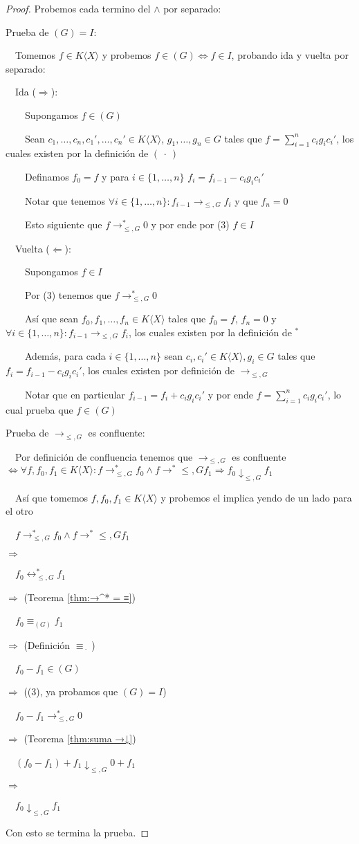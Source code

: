\documentclass{amsbook}
\theoremstyle{customstyle}
\begin{document}
\begin{proof}
Probemos cada termino del $∧$ por separado:

Prueba de $(G) = I$:

  Tomemos $f ∈ K⟨X⟩$ y probemos $f ∈ (G) ⇔ f ∈ I$, probando ida y vuelta por separado:

  Ida ($⇒$):

    Supongamos $f ∈ (G)$

    Sean $c_1, …, c_n, c_1', …, c_n' ∈ K⟨X⟩$, $g_1, …, g_n ∈ G$ tales que $f = \sum_{i = 1}^n c_i g_i c_i'$, los cuales existen por la definición de $(\ ·\ )$

    Definamos $f_0 = f$ y para $i ∈ \{1, …, n\}$ $f_i = f_{i-1} - c_i g_i c_i'$

    Notar que tenemos $∀i ∈ \{1, …, n\} : f_{i-1} →_{≤, G} f_i$ y que $f_n = 0$

    Esto siguiente que $f →^*_{≤, G} 0$ y por ende por (3) $f ∈ I$

  Vuelta ($⇐$):

    Supongamos $f ∈ I$

    Por (3) tenemos que $f →^*_{≤, G} 0$

    Así que sean $f_0, f_1, …, f_n ∈ K⟨X⟩$ tales que $f_0 = f$, $f_n = 0$ y $∀i ∈ \{1, …, n\} : f_{i-1} →_{≤, G} f_i$, los cuales existen por la definición de $^*$

    Además, para cada $i ∈ \{1, …, n\}$ sean $c_i, c_i' ∈ K⟨X⟩, g_i ∈ G$ tales que $f_i = f_{i-1} - c_i g_i c_i'$, los cuales existen por definición de $→_{≤, G}$

    Notar que en particular $f_{i-1} = f_i + c_i g_i c_i'$ y por ende $f = \sum_{i = 1}^n c_i g_i c_i'$, lo cual prueba que $f ∈ (G)$

Prueba de $→_{≤, G}$ es confluente:

  Por definición de confluencia tenemos que $→_{≤, G}$ es confluente $⇔ ∀f, f_0, f_1 ∈ K⟨X⟩ : f →^*_{≤, G} f_0 ∧ f →^*{≤, G} f_1 ⇒ f_0 ↓_{≤, G} f_1$

  Así que tomemos $f, f_0, f_1 ∈ K⟨X⟩$ y probemos el implica yendo de un lado para el otro

  $f →^*_{≤, G} f_0 ∧ f →^*{≤, G} f_1$

$⇒$

  $f_0 ↔^*_{≤, G} f_1$

$⇒$ (Teorema \ref{thm:→^* = ≡})

  $f_0 ≡_{(G)} f_1$

$⇒$ (Definición $≡_{\ ·\ }$)

  $f_0 - f_1 ∈ (G)$

$⇒$ ((3), ya probamos que $(G) = I$)

  $f_0 - f_1 →^*_{≤, G} 0$

$⇒$ (Teorema \ref{thm:suma →↓})

  $(f_0 - f_1) + f_1 ↓_{≤, G} 0 + f_1$

$⇒$

  $f_0 ↓_{≤, G} f_1$

Con esto se termina la prueba.

\end{proof}
\end{document}
